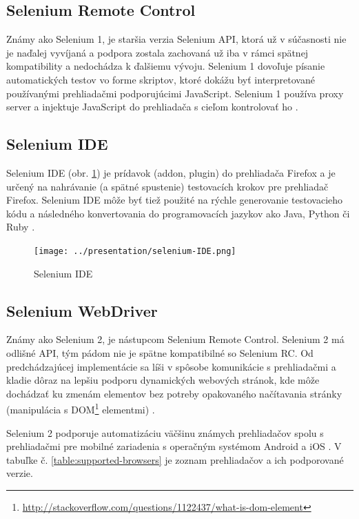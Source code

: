 \subsection{Selenium Remote Control}
Známy ako Selenium 1, je staršia verzia Selenium \acs{API}, ktorá už v súčasnosti nie je naďalej vyvíjaná a podpora zostala zachovaná už
iba v rámci spätnej kompatibility a nedochádza k ďalšiemu vývoju.
Selenium 1 dovoľuje písanie automatických testov vo forme skriptov, ktoré dokážu byť interpretované používanými prehliadačmi podporujúcimi JavaScript. Selenium 1 používa proxy server a injektuje JavaScript do prehliadača s cieľom kontrolovať ho \cite{thesis-automation-testing,selenium-doc}.
\subsection{Selenium IDE}
Selenium \acs{IDE} (obr. \ref{image:selenium-ide}) je prídavok (addon, plugin) do prehliadača Firefox a je určený na nahrávanie (a spätné spustenie) testovacích krokov pre prehliadač Firefox. Selenium \acs{IDE} môže byť tiež použité na rýchle generovanie testovacieho kódu a následného konvertovania do programovacích jazykov ako Java, Python či Ruby \cite{selenium-wikipedia}.

\begin{figure}[h]
  \centering
  \texttt{[image: ../presentation/selenium-IDE.png]}
  \caption{Selenium IDE}
  \label{image:selenium-ide}
\end{figure}

\subsection{Selenium WebDriver}
Známy ako Selenium 2, je nástupcom Selenium Remote Control. Selenium 2 má odlišné \acs{API}, tým pádom nie je spätne kompatibilné so Selenium RC.
Od predchádzajúcej implementácie sa líši v spôsobe komunikácie s prehliadačmi a kladie dôraz na lepšiu podporu dynamických webových stránok, kde môže dochádzať ku zmenám elementov bez potreby opakovaného načítavania stránky (manipulácia s \acs{DOM}\footnote{\url{http://stackoverflow.com/questions/1122437/what-is-dom-element}} elementmi) \cite{thesis-automation-testing,selenium-doc}.

Selenium 2 podporuje automatizáciu väčšinu známych prehliadačov spolu s prehliadačmi pre mobilné zariadenia s operačným systémom Android a iOS \cite{selenium-mobile}. V tabuľke č. \ref{table:supported-browsers} je zoznam prehliadačov a ich podporované verzie.

